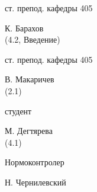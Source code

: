 \vskip1cm

\begin{minipage}[t]{0.7\linewidth}
ст. препод. кафедры 405 \\
\end{minipage}
\begin{minipage}[t]{0.3\linewidth}
К. Барахов \\
(4.2, Введение)
\end{minipage}

\vskip1cm

\begin{minipage}[t]{0.7\linewidth}
ст. препод. кафедры 405 \\
\end{minipage}
\begin{minipage}[t]{0.3\linewidth}
В. Макаричев \\
(2.1)
\end{minipage}

\vskip1cm

\begin{minipage}[t]{0.7\linewidth}
студент \\
\end{minipage}
\begin{minipage}[t]{0.3\linewidth}
М. Дегтярева \\
(4.1)
\end{minipage}

\vskip2cm

\begin{minipage}[t]{0.7\linewidth}
Нормоконтролер
\end{minipage}
\begin{minipage}[t]{0.3\linewidth}
Н. Чернилевский
\end{minipage}
